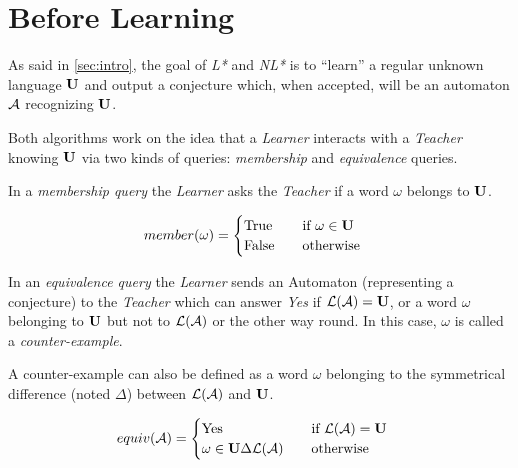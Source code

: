 \section{Before Learning}
As said in \cref{sec:intro}, the goal of \textit{L*} and \textit{NL*} is to ``learn'' a regular unknown language $\mathbf{U}$ and output a conjecture which, when accepted, will be an automaton $\mathcal{A}$ recognizing $\mathbf{U}$.

Both algorithms work on the idea that a \textit{Learner} interacts with a \textit{Teacher} knowing $\mathbf{U}$ via two kinds of queries: \textit{membership} and \textit{equivalence} queries.

In a \textit{membership query} the \textit{Learner} asks the \textit{Teacher} if a word $\omega$ belongs to $\mathbf{U}$.

\begin{equation}
  \begin{aligned}
    \label{eq:interactions}
    member(\omega) & =
    \begin{cases}
      \text{True}  & \quad  \text{if } \omega \in \mathbf{U} \\
      \text{False} & \quad   \text{otherwise}
    \end{cases}
  \end{aligned}
\end{equation}


In an \textit{equivalence query} the \textit{Learner} sends an Automaton (representing a conjecture) to the \textit{Teacher} which can answer \textit{Yes} if $\mathcal{L}(\mathcal{A}) = \mathbf{U}$, or a word $\omega$ belonging to $\mathbf{U}$ but not to $\mathcal{L}(\mathcal{A})$ or the other way round. In this case, $\omega$ is called a \textit{counter-example}.

A counter-example can also be defined as a word $\omega$ belonging to the symmetrical difference (noted $\Delta$) between $\mathcal{L}(\mathcal{A})$ and $\mathbf{U}$.

\begin{equation}
  \begin{aligned}
    equiv(\mathcal{A}) & =
    \begin{cases}
      \text{Yes}               & \quad \text{if } \mathcal{L}(\mathcal{A}) = \mathbf{U} \\
      \omega \in \mathbf{U} \Delta \mathcal{L}(\mathcal{A}) & \quad \text{otherwise}
    \end{cases}
  \end{aligned}
\end{equation}


